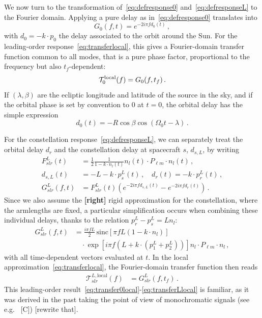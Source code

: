 \documentclass[aps,showpacs,twocolumn,
prd,superscriptaddress,nofootinbib]{revtex4-1}
\newcommand{\be}{\begin{equation}}
\newcommand{\ee}{\end{equation}}
\newcommand\calT{{\mathcal{T}}}
\newcommand{\nn}{\nonumber}
\newcommand{\hatk}{k}
\newcommand{\sinc}{\,\mathrm{sinc}}
\newcommand{\tf}{t_{f}}
\newcommand{\SM}[1]{{\color{Red} #1}}
\newcommand{\jgb}[1]{{\color{DarkGreen} #1}}
\begin{document}
We now turn to the transformation of~\eqref{eq:defresponse0} and~\eqref{eq:defresponseL} to the Fourier domain. Applying a pure delay as in~\eqref{eq:defresponse0} translates into
\be\label{eq:G0}
	G_{0}(f, t) = e^{-2i\pi f d_{0}(t)} \,,
\ee
with $d_{0} = -\hatk \cdot p_{0}$ the delay associated to the orbit around the Sun. For the leading-order response~\eqref{eq:transferlocal}, this gives a Fourier-domain transfer function common to all modes, that is a pure phase factor, proportional to the frequency but also $t_{f}$-dependent:
\be\label{eq:transfer0local}
	\calT_{0}^{\rm local}(f) = G_{0}(f, \tf)\,.
\ee
If $(\lambda, \beta)$ are the ecliptic longitude and latitude of the source in the sky, and if the orbital phase is set by convention to $0$ at $t=0$, the orbital delay has the simple expression
\be\label{eq:delay0}
	d_{0}(t) = -R \cos\beta \cos\left(\Omega_{0}t - \lambda\right)\,.
\ee

For the constellation response~\eqref{eq:defresponseL}, we can \jgb{separately treat the orbital delay $d_r$ and the constellation delay at spacecraft $s$, $d_{s,L}$}, by writing
\begin{align}\label{eq:decomposeGslr}
	F_{slr}^{L}(t) &= \frac{1}{2} \frac{1}{1 - \hatk\cdot n_{l}(t)} n_{l}(t) \cdot P_{\ell m} \cdot n_{l} (t) \,,\nn\\
	d_{s,L}(t) &= -L - k\cdot p_{s}^{L}(t) \,, \quad d_{r}(t) = - k\cdot p_{r}^{L}(t) \,,\nn\\
	G_{slr}^{L}(f,t) &=  F_{slr}^{L}(t) \left( e^{-2i\pi f d_{s,L}(t)} - e^{-2i\pi f d_{r}(t)} \right) \,.
\end{align}
\jgb{Since we also assume the {\bf[right]} } rigid approximation for the constellation, where the armlengths are fixed, a particular simplification occurs when combining these individual delays, thanks to the relation $p^{L}_{r} - p^{L}_{s} =  L n_{l}$:
\begin{align}\label{eq:GslrL}
	G_{slr}^{L}(f,t) &= \frac{i \pi f L}{2} \sinc \left[ \pi f L\left(1-\hatk\cdot n_{l} \right) \right] \nn\\
	& \quad \cdot \exp\left[ i \pi f \left( L + \hatk\cdot \left( p_{1}^{L} + p_{2}^{L} \right) \right) \right]  n_{l} \cdot P_{\ell m} \cdot n_{l} \,,
\end{align}
with all time-dependent vectors evaluated at $t$. In the local approximation~\eqref{eq:transferlocal}, the Fourier-domain transfer function then reads
\begin{align}\label{eq:transferLlocal}
	\calT_{slr}^{L, \mathrm{local}}(f) &= G_{slr}^{L}(f, \tf) \,.
\end{align}
This leading-order result~\eqref{eq:transfer0local}-\eqref{eq:transferLlocal} is familiar, as it was derived in the past taking the point of view of monochromatic signals (see e.g.~\cite{} \SM{[C]}) \SM{[rewrite that]}.
\end{document}
